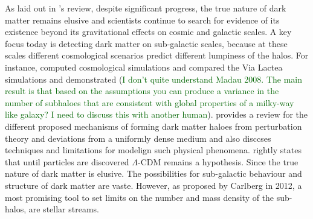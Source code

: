 \documentclass[draft]{aa}
\newcommand{\salvatore}[1]{\textcolor{darkgreen}{{#1}}}
\begin{document}
  As laid out in \citet{2021PrPNP.11903865A}'s review, despite significant progress, the true nature of dark matter remains elusive and scientists continue to search for evidence of its existence beyond its gravitational effects on cosmic and galactic scales. A key focus today is detecting dark matter on sub-galactic scales, because at these scales different cosmological scenarios predict different lumpiness of the halos. For instance, \citet{2008ApJ...679.1260M} computed cosmological simulations and compared the Via Lactea simulations \citep{2008ApJ...679.1260M} and demonstrated (\salvatore{I don't quite understand Madau 2008. The main result is that based on the assumptions you can produce a variance in the number of subhaloes that are consistent with global properties of a milky-way like galaxy? I need to discuss this with another human}). \citet{2019Galax...7...81Z} provides a review for the different proposed mechanisms of forming dark matter haloes from perturbation theory and deviations from a uniformly dense medium and also disccses techniques and limitations for modelign such physical phenomena. \citet{2019Galax...7...81Z} rightly states that until particles are discovered $\Lambda$-CDM remains a hypothesis. Since the true nature of dark matter is elusive. The possibilities for sub-galactic behaviour and structure of dark matter are vaste. However, as proposed by Carlberg in 2012, a most promising tool to set limits on the number and mass density of the sub-halos, are stellar streams.
  
\end{document}
